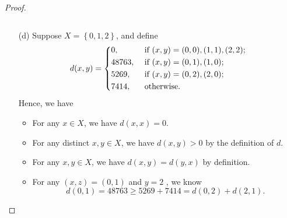 \begin{proof}
\begin{itemize}
\begin{itemize}[\(\bullet\)]
\[      \]      
    \end{itemize}
    \item [(d)] Suppose \(X = \left\{ 0, 1, 2 \right\} \), and define 
    \[
      d(x,y) = \begin{dcases}
        0, &\text{ if } (x,y) = (0, 0), (1, 1), (2, 2) ;\\
        48763, &\text{ if }  (x,y) = (0, 1), (1, 0);\\
        5269, &\text{ if } (x,y) = (0,2), (2,0);\\
        7414, &\text{ otherwise}.
      \end{dcases}
    \] 
    Hence, we have 
    \begin{itemize}[\(\bullet\) ]
      \item For any \(x \in X\), we have \(d(x, x) = 0\).
      \item For any distinct \(x, y \in X\), we have \(d(x,y) > 0\) by the definition of \(d\). 
      \item For any \(x,y \in X\), we have \(d(x,y)=d(y,x)\) by definition. 
      \item For any \((x,z) = (0, 1)\) and \(y=2\) , we know
      \[
        d(0, 1) = 48763 \ge 5269 + 7414 = d(0, 2) + d(2, 1).
      \]
    \end{itemize}
  \end{itemize}
\end{proof}


